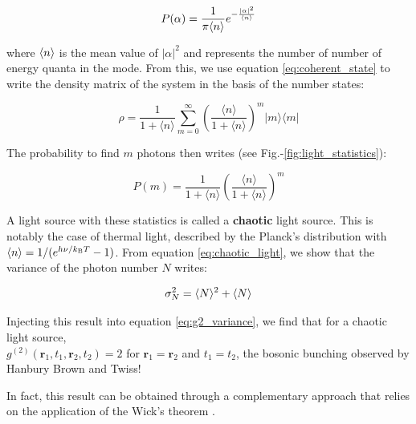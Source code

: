\begin{equation}
    P(\alpha)= \frac{1}{\pi \langle n\rangle} e^{-\frac{|\alpha|^2}{\langle n\rangle}}
    \label{eq:p_alpha}
\end{equation}

\noindent where $\langle n\rangle$ is the mean value of $|\alpha|^2$ and represents the number of number of energy quanta in the mode. From this, we use equation \ref{eq:coherent_state} to write the density matrix of the system in the basis of the number states:

\begin{equation}
    \hat{\rho}=\frac{1}{1+\langle n\rangle} \sum_{m=0}^{\infty}\left(\frac{\langle n\rangle}{1+\langle n\rangle}\right)^{m}|m\rangle\langle m|
    \label{eq:rho_chaotic}
\end{equation}

\noindent The probability to find $m$ photons then writes (see Fig.-\ref{fig:light_statistics}):

\begin{equation}
    P(m)=\frac{1}{1+\langle n\rangle}\left(\frac{\langle n\rangle}{1+\langle n\rangle}\right)^{m}
    \label{eq:chaotic_light}
\end{equation}


\noindent A light source with these statistics is called a \textbf{chaotic} light source. This is notably the case of thermal light, described by the Planck's distribution with $\langle n\rangle=1/(e^{h\nu/k_{\mathrm{B}} T}-1)$. From equation \ref{eq:chaotic_light}, we show that the variance of the photon number $N$ writes:

\begin{equation}
    \sigma_N^2=\langle N\rangle^2+\langle N\rangle
\end{equation}

\noindent Injecting this result into equation \ref{eq:g2_variance}, we find that for a chaotic light source, \\ $g^{(2)}\left(\bm{r}_{1}, t_{1}, \bm{r}_{2}, t_{2}\right)=2$ for $\bm{r}_{1}=\bm{r}_{2}$ and $t_1=t_2$, the bosonic bunching observed by Hanbury Brown and Twiss!




In fact, this result can be obtained through a complementary approach that relies on the application of the Wick's theorem \cite{gardiner2000quantum}.


